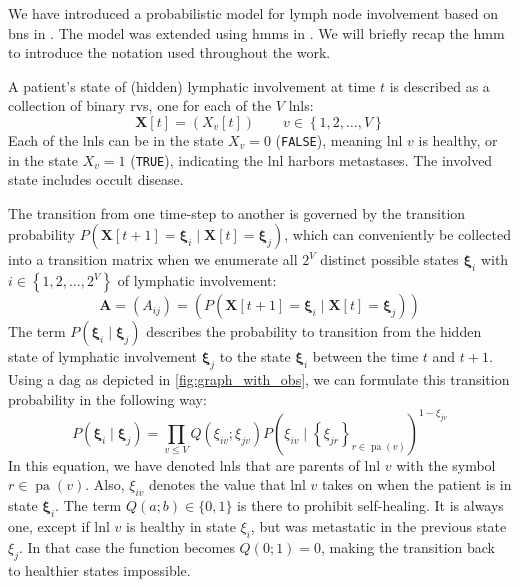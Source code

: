 \documentclass[twocolumn]{aastex631}
\begin{document}
We have introduced a probabilistic model for lymph node involvement based on \glspl{bn} in \citep{pouymayou_bayesian_2019}. The model was extended using \glspl{hmm} in \citep{ludwig_hidden_2021}. We will briefly recap the \acrlong{hmm} to introduce the notation used throughout the work.

A patient's state of (hidden) lymphatic involvement at time $t$ is described as a collection of binary \glspl{rv}, one for each of the $V$ \glspl{lnl}:
%
\begin{equation}
    \mathbf{X}[t] = \left( X_v[t] \right) \qquad v \in \left\{ 1,2, \ldots, V \right\}
\end{equation}
%
Each of the \glspl{lnl} can be in the state $X_v=0$ (\texttt{FALSE}), meaning \gls{lnl} $v$ is healthy, or in the state $X_v=1$ (\texttt{TRUE}), indicating the \gls{lnl} harbors metastases. The involved state includes occult disease.

The transition from one time-step to another is governed by the transition probability $P\left( \mathbf{X}[t+1]=\boldsymbol{\xi}_i \mid \mathbf{X}[t]=\boldsymbol{\xi}_j \right)$, which can conveniently be collected into a transition matrix when we enumerate all $2^V$ distinct possible states $\boldsymbol{\xi}_i$ with $i \in \left\{ 1,2, \ldots, 2^V \right\}$ of lymphatic involvement:
%
\begin{equation}
    \mathbf{A} = \left( A_{ij} \right) = \left( P\left( \mathbf{X}[t+1]=\boldsymbol{\xi}_i \mid \mathbf{X}[t]=\boldsymbol{\xi}_j \right) \right)
\end{equation}
%
The term $P\left( \boldsymbol{\xi}_i \mid \boldsymbol{\xi}_j \right)$ describes the probability to transition from the hidden state of lymphatic involvement $\boldsymbol{\xi}_j$ to the state $\boldsymbol{\xi}_i$ between the time $t$ and $t+1$. Using a \gls{dag} as depicted in \autoref{fig:graph_with_obs}, we can formulate this transition probability in the following way:
%
\begin{equation}
    \label{eq:transition_prob}
    P\left( \boldsymbol{\xi}_i \mid \boldsymbol{\xi}_j \right) = \prod_{v \leq V} Q\left( \xi_{iv} ; \xi_{jv} \right) P \left( \xi_{iv} \mid \left\{ \xi_{jr} \right\}_{r \in \operatorname{pa}(v)} \right)^{1 - \xi_{jv}}
\end{equation}
%
In this equation, we have denoted \glspl{lnl} that are parents of \gls{lnl} $v$ with the symbol $r\in\operatorname{pa}(v)$. Also, $\xi_{iv}$ denotes the value that \gls{lnl} $v$ takes on when the patient is in state $\boldsymbol{\xi}_i$. The term $Q(a;b) \in \{ 0,1 \}$ is there to prohibit self-healing. It is always one, except if \gls{lnl} $v$ is healthy in state $\xi_i$, but was metastatic in the previous state $\xi_j$. In that case the function becomes $Q(0;1) = 0$, making the transition back to healthier states impossible.
\end{document}
